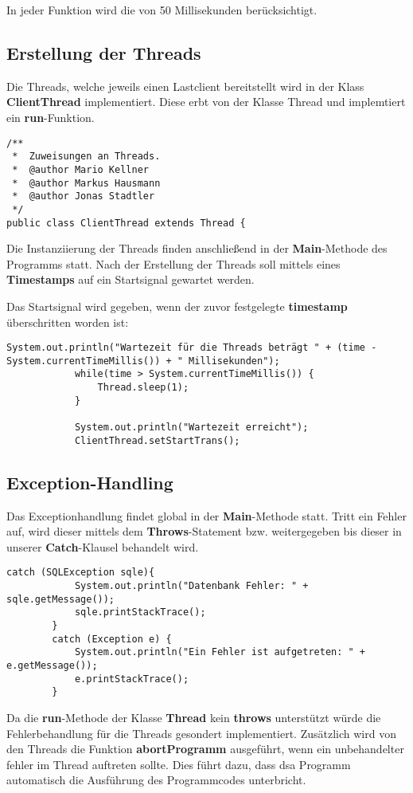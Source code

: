 In jeder Funktion wird die  von 50 Millisekunden berücksichtigt.

\subsection{Erstellung der Threads}

Die Threads, welche jeweils einen Lastclient bereitstellt wird in der Klass
\textbf{ClientThread} implementiert. Diese erbt von der Klasse Thread und
implemtiert ein \textbf{run}-Funktion.

\begin{lstlisting}[caption={Ausschnitt aus ClientThread}]
/**
 *  Zuweisungen an Threads.
 *  @author Mario Kellner
 *	@author Markus Hausmann
 *  @author Jonas Stadtler
 */
public class ClientThread extends Thread {
\end{lstlisting}

Die Instanziierung der Threads finden anschließend in der
\textbf{Main}-Methode des Programms statt. Nach der Erstellung der Threads
soll mittels eines \textbf{Timestamps} auf ein Startsignal gewartet werden.


Das Startsignal wird gegeben, wenn der zuvor festgelegte \textbf{timestamp}
überschritten worden ist:

\begin{lstlisting}[caption={Wartezeit}]
		    System.out.println("Wartezeit für die Threads beträgt " + (time - System.currentTimeMillis()) + " Millisekunden");
		    while(time > System.currentTimeMillis()) {
		    	Thread.sleep(1);
		    }
		    
		    System.out.println("Wartezeit erreicht");
		    ClientThread.setStartTrans();
\end{lstlisting}


\subsection{Exception-Handling}

Das Exceptionhandlung findet global in der \textbf{Main}-Methode statt. Tritt
ein Fehler auf, wird dieser mittels dem \textbf{Throws}-Statement
 bzw. weitergegeben bis dieser in unserer \textbf{Catch}-Klausel behandelt wird.

\begin{lstlisting}[caption={Catch-Block}]
		catch (SQLException sqle){
			System.out.println("Datenbank Fehler: " + sqle.getMessage());
			sqle.printStackTrace();
		}
 		catch (Exception e) {
			System.out.println("Ein Fehler ist aufgetreten: " + e.getMessage());
			e.printStackTrace();
		}
\end{lstlisting}

Da die \textbf{run}-Methode der Klasse \textbf{Thread} kein \textbf{throws}
unterstützt würde die Fehlerbehandlung für die Threads gesondert implementiert.
Zusätzlich wird von den Threads die Funktion \textbf{abortProgramm}
ausgeführt, wenn ein unbehandelter fehler im Thread auftreten sollte. Dies führt
dazu, dass dsa Programm automatisch die Ausführung des Programmcodes
unterbricht.

\clearpage